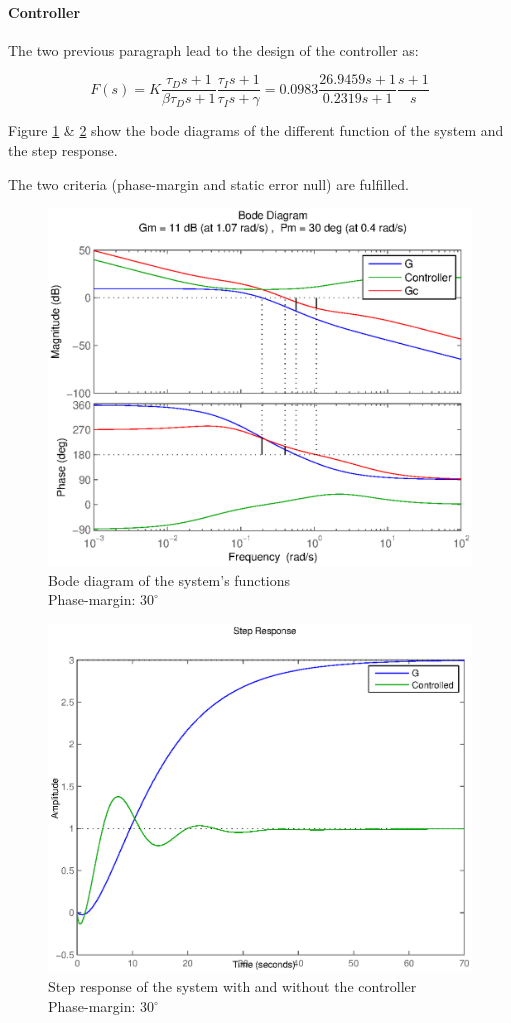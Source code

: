 \paragraph{Controller}

The two previous paragraph lead to the design of the controller as:

$$ F(s) = K \frac{\tau_D s + 1}{\beta \tau_D s + 1} \frac{\tau_I s + 1}{\tau_I s + \gamma} = 0.0983 \frac{26.9459 s + 1}{0.2319 s + 1}\frac{s+1}{s}$$

Figure \ref{figbode411} \& \ref{figstep411} show the bode diagrams of the different function of the system and the step response. 

The two criteria (phase-margin and static error null) are fulfilled.

\begin{figure}[h!b]
    \includegraphics[width=\columnwidth]{fig/bode411.eps}
    \caption{Bode diagram of the system's functions\\ Phase-margin: $30^{\circ}$} 
    \label{figbode411}
\end{figure}

\begin{figure}[h!b]
    \includegraphics[width=\columnwidth]{fig/step411.eps}
    \caption{Step response of the system with and without the controller\\ Phase-margin: $30^{\circ}$}
    \label{figstep411}
\end{figure}




